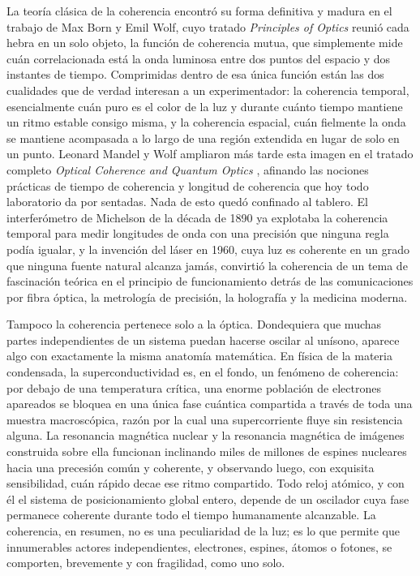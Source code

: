 	La teoría clásica de la coherencia encontró su forma definitiva y madura en el trabajo de Max Born y Emil Wolf, cuyo tratado \textit{Principles of Optics} \cite{born1999principles} reunió cada hebra en un solo objeto, la función de coherencia mutua, que simplemente mide cuán correlacionada está la onda luminosa entre dos puntos del espacio y dos instantes de tiempo. Comprimidas dentro de esa única función están las dos cualidades que de verdad interesan a un experimentador: la coherencia temporal, esencialmente cuán puro es el color de la luz y durante cuánto tiempo mantiene un ritmo estable consigo misma, y la coherencia espacial, cuán fielmente la onda se mantiene acompasada a lo largo de una región extendida en lugar de solo en un punto. Leonard Mandel y Wolf ampliaron más tarde esta imagen en el tratado completo \textit{Optical Coherence and Quantum Optics} \cite{mandel1995optical}, afinando las nociones prácticas de tiempo de coherencia y longitud de coherencia que hoy todo laboratorio da por sentadas. Nada de esto quedó confinado al tablero. El interferómetro de Michelson de la década de 1890 ya explotaba la coherencia temporal para medir longitudes de onda con una precisión que ninguna regla podía igualar, y la invención del láser en 1960, cuya luz es coherente en un grado que ninguna fuente natural alcanza jamás, convirtió la coherencia de un tema de fascinación teórica en el principio de funcionamiento detrás de las comunicaciones por fibra óptica, la metrología de precisión, la holografía y la medicina moderna.

	Tampoco la coherencia pertenece solo a la óptica. Dondequiera que muchas partes independientes de un sistema puedan hacerse oscilar al unísono, aparece algo con exactamente la misma anatomía matemática. En física de la materia condensada, la superconductividad es, en el fondo, un fenómeno de coherencia: por debajo de una temperatura crítica, una enorme población de electrones apareados se bloquea en una única fase cuántica compartida a través de toda una muestra macroscópica, razón por la cual una supercorriente fluye sin resistencia alguna. La resonancia magnética nuclear y la resonancia magnética de imágenes construida sobre ella funcionan inclinando miles de millones de espines nucleares hacia una precesión común y coherente, y observando luego, con exquisita sensibilidad, cuán rápido decae ese ritmo compartido. Todo reloj atómico, y con él el sistema de posicionamiento global entero, depende de un oscilador cuya fase permanece coherente durante todo el tiempo humanamente alcanzable. La coherencia, en resumen, no es una peculiaridad de la luz; es lo que permite que innumerables actores independientes, electrones, espines, átomos o fotones, se comporten, brevemente y con fragilidad, como uno solo.

